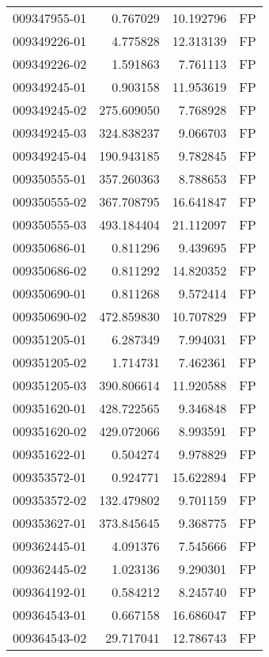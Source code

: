 \begin{tabular}{lrrl}
009347955-01 &    0.767029 &      10.192796 &   FP \\
009349226-01 &    4.775828 &      12.313139 &   FP \\
009349226-02 &    1.591863 &       7.761113 &   FP \\
009349245-01 &    0.903158 &      11.953619 &   FP \\
009349245-02 &  275.609050 &       7.768928 &   FP \\
009349245-03 &  324.838237 &       9.066703 &   FP \\
009349245-04 &  190.943185 &       9.782845 &   FP \\
009350555-01 &  357.260363 &       8.788653 &   FP \\
009350555-02 &  367.708795 &      16.641847 &   FP \\
009350555-03 &  493.184404 &      21.112097 &   FP \\
009350686-01 &    0.811296 &       9.439695 &   FP \\
009350686-02 &    0.811292 &      14.820352 &   FP \\
009350690-01 &    0.811268 &       9.572414 &   FP \\
009350690-02 &  472.859830 &      10.707829 &   FP \\
009351205-01 &    6.287349 &       7.994031 &   FP \\
009351205-02 &    1.714731 &       7.462361 &   FP \\
009351205-03 &  390.806614 &      11.920588 &   FP \\
009351620-01 &  428.722565 &       9.346848 &   FP \\
009351620-02 &  429.072066 &       8.993591 &   FP \\
009351622-01 &    0.504274 &       9.978829 &   FP \\
009353572-01 &    0.924771 &      15.622894 &   FP \\
009353572-02 &  132.479802 &       9.701159 &   FP \\
009353627-01 &  373.845645 &       9.368775 &   FP \\
009362445-01 &    4.091376 &       7.545666 &   FP \\
009362445-02 &    1.023136 &       9.290301 &   FP \\
009364192-01 &    0.584212 &       8.245740 &   FP \\
009364543-01 &    0.667158 &      16.686047 &   FP \\
009364543-02 &   29.717041 &      12.786743 &   FP \\

\end{tabular}
